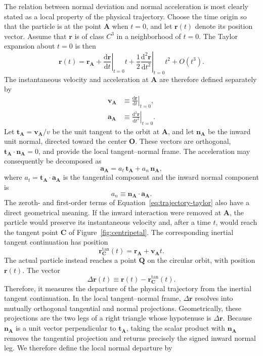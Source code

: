 \documentclass[preprint,12pt,3p,nopreprintline]{elsarticle}
\newcommand{\dd}{\mathrm{d}}
\newcommand{\pt}[1]{\mathbf{#1}}
\newcommand{\be}{\begin{equation}}
\newcommand{\ee}{\end{equation}}
\numberwithin{equation}{section}
\theoremstyle{remark}
\begin{document}
The relation between normal deviation and normal acceleration is most clearly stated as a local property of the physical trajectory. Choose the time origin so that the particle is at the point $\pt{A}$ when $t=0$, and let $\mathbf{r}(t)$ denote its position vector. Assume that $\mathbf{r}$ is of class $C^3$ in a neighborhood of $t=0$. The Taylor expansion about $t=0$ is then
\be
\mathbf{r}(t)=\mathbf{r}_{\pt{A}}
+\left.\frac{\dd\mathbf{r}}{\dd t}\right|_{t=0}t
+\frac{1}{2}\left.\frac{\dd^2\mathbf{r}}{\dd t^2}\right|_{t=0}t^2
+O(t^3).
\label{eq:trajectory-taylor}
\ee
The instantaneous velocity and acceleration at $\pt{A}$ are therefore defined separately by
\begin{subequations}\label{eq:va-aa-definitions}
\begin{align}
\mathbf{v}_{\pt{A}}&\equiv\left.\frac{\dd\mathbf{r}}{\dd t}\right|_{t=0},
\label{eq:velocity-A}\\
\mathbf{a}_{\pt{A}}&\equiv\left.\frac{\dd^2\mathbf{r}}{\dd t^2}\right|_{t=0}.
\label{eq:acceleration-A}
\end{align}
\end{subequations}
Let $\mathbf{t}_{\pt{A}}=\mathbf{v}_{\pt{A}}/v$ be the unit tangent to the orbit at $\pt{A}$, and let $\mathbf{n}_{\pt{A}}$ be the inward unit normal, directed toward the center $\pt{O}$. These vectors are orthogonal, $\mathbf{t}_{\pt{A}}\!\cdot\!\mathbf{n}_{\pt{A}}=0$, and provide the local tangent--normal frame. The acceleration may consequently be decomposed as
\be
\mathbf{a}_{\pt{A}}=a_t\,\mathbf{t}_{\pt{A}}+a_n\,\mathbf{n}_{\pt{A}},
\label{eq:acc-decomposition}
\ee
where $a_t=\mathbf{t}_{\pt{A}}\!\cdot\!\mathbf{a}_{\pt{A}}$ is the tangential component and the inward normal component is
\be
 a_n\equiv\mathbf{n}_{\pt{A}}\!\cdot\!\mathbf{a}_{\pt{A}}.
\label{eq:normal-acc-component}
\ee
The zeroth- and first-order terms of Equation~\eqref{eq:trajectory-taylor} also have a direct geometrical meaning. If the inward interaction were removed at $\pt{A}$, the particle would preserve its instantaneous velocity and, after a time $t$, would reach the tangent point $\pt{C}$ of Figure~\ref{fig:centripetal}. The corresponding inertial tangent continuation has position
\be
\mathbf{r}^{\mathrm{tan}}_{\pt{C}}(t)=\mathbf{r}_{\pt{A}}+\mathbf{v}_{\pt{A}}t.
\label{eq:tangent-continuation}
\ee
The actual particle instead reaches a point $\pt{Q}$ on the circular orbit, with position $\mathbf{r}(t)$. The vector
\be
\Delta\mathbf{r}(t)\equiv\mathbf{r}(t)-\mathbf{r}^{\mathrm{tan}}_{\pt{C}}(t).
\label{eq:delta-r}
\ee
Therefore, it measures the departure of the physical trajectory from the inertial tangent continuation. In the local tangent--normal frame, $\Delta\mathbf{r}$ resolves into mutually orthogonal tangential and normal projections. Geometrically, these projections are the two legs of a right triangle whose hypotenuse is $\Delta\mathbf{r}$. Because $\mathbf{n}_{\pt{A}}$ is a unit vector perpendicular to $\mathbf{t}_{\pt{A}}$, taking the scalar product with $\mathbf{n}_{\pt{A}}$ removes the tangential projection and returns precisely the signed inward normal leg. We therefore define the local normal departure by
\end{document}
